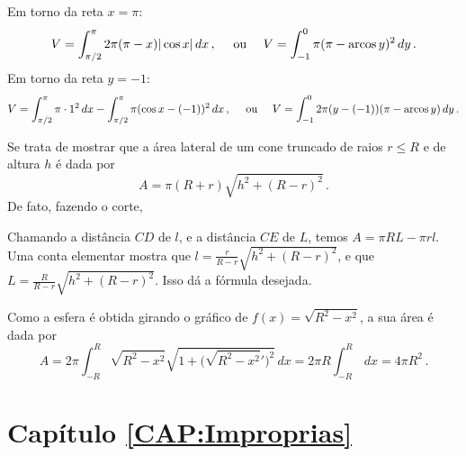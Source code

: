 \begin{Solution}{10.14}
Em torno da reta $x=\pi$:
$$
V=\int_{\pi/2}^{\pi}2\pi(\pi-x)|\cos x|\,dx\,,\quad\text{ ou }
\quad V=\int_{-1}^0\pi(\pi-\operatorname{arcos} y)^2\,dy\,.
$$
Em torno da reta $y=-1$:
$$
V=\int_{\pi/2}^\pi \pi\cdot 1^2\,dx-\int_{\pi/2}^\pi\pi(\cos
x -(-1))^2\,dx\,,\quad\text{ ou }
\quad V=\int_{-1}^02\pi (y-(-1))(\pi-\operatorname{arcos} y)\,dy\,.
$$
\end{Solution}
\begin{Solution}{10.16}
Se trata de mostrar que
a área lateral de um cone truncado de raios $r\leq R$
e de altura $h$ é dada por
$$
A=\pi (R+r)\sqrt{h^2+(R-r)^2}\,.
$$
De fato, fazendo o corte,
\begin{center}
\begin{bmlimage}\end{bmlimage}
\end{center}
Chamando a distância $CD$ de $l$, e a distância $CE$ de $L$, temos
$A=\pi R L-\pi rl$. Uma conta elementar mostra que
$l=\frac{r}{R-r}\sqrt{h^2+(R-r)^2}$, e que
$L=\frac{R}{R-r}\sqrt{h^2+(R-r)^2}$.
Isso dá a fórmula desejada.
\end{Solution}
\begin{Solution}{10.17}
Como a esfera é obtida girando o gráfico de
$f(x)=\sqrt{R^2-x^2}$, a sua área é dada por
$$
A=2\pi\int_{-R}^R\sqrt{R^2-x^2}\sqrt{1+\bigl(\sqrt{R^2-x^2}'\bigr)^2}\,dx
=2\pi R\int_{-R}^R\,dx= 4\pi R^2\,.
$$
\end{Solution}
\protect \section *{Capítulo \ref {CAP:Improprias}}

